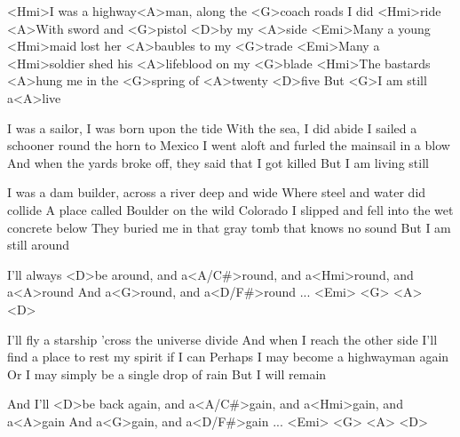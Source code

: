 
\zs
<Hmi>I was a highway<A>man, along the <G>coach roads I did <Hmi>ride
<A>With sword and <G>pistol <D>by my <A>side
<Emi>Many a young <Hmi>maid lost her <A>baubles to my <G>trade
<Emi>Many a <Hmi>soldier shed his <A>lifeblood on my <G>blade
<Hmi>The bastards <A>hung me in the <G>spring of <A>twenty <D>five
But <G>I am still a<A>live
\ks

\zs
I was a sailor, I was born upon the tide
With the sea, I did abide
I sailed a schooner round the horn to Mexico
I went aloft and furled the mainsail in a blow
And when the yards broke off, they said that I got killed
But I am living still
\ks

\zs
I was a dam builder, across a river deep and wide
Where steel and water did collide
A place called Boulder on the wild Colorado
I slipped and fell into the wet concrete below
They buried me in that gray tomb that knows no sound
But I am still around
\ks

\zs
I'll always <D>be around, and a<A/C#>round, and a<Hmi>round, and a<A>round
And a<G>round, and a<D/F#>round ... <Emi> <G> <A> <D>
\ks

\zs
I'll fly a starship 'cross the universe divide
And when I reach the other side
I'll find a place to rest my spirit if I can
Perhaps I may become a highwayman again
Or I may simply be a single drop of rain
But I will remain
\ks

\zs
And I'll <D>be back again, and a<A/C#>gain, and a<Hmi>gain, and a<A>gain
And a<G>gain, and a<D/F#>gain ... <Emi> <G> <A> <D>
\ks

\kp
